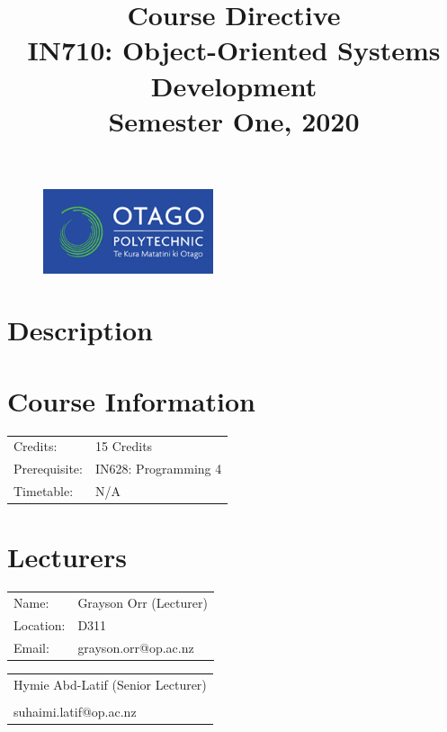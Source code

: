 \documentclass{article}
\author{}
\begin{document}
\begin{figure}
	\includegraphics[width=50mm]{../../resources/img/logo.png}
\end{figure}

\title{Course Directive\\IN710: Object-Oriented Systems Development\\Semester One, 2020}
\date{}
\maketitle

\section*{Description}

\section*{Course Information}
\begin{tabular}{ll}
	Credits:      & 15 Credits           \\
	Prerequisite: & IN628: Programming 4 \\
	Timetable:    & N/A                  \\
\end{tabular}

\section*{Lecturers}
\begin{tabular}{ll}
	Name:     & Grayson Orr (Lecturer) \\
	Location: & D311                   \\
	Email:    & grayson.orr@op.ac.nz   \\
\end{tabular}
\begin{tabular}{l}
	Hymie Abd-Latif (Senior Lecturer) \\
	                                  \\
	suhaimi.latif@op.ac.nz            \\
\end{tabular}
\end{document}
